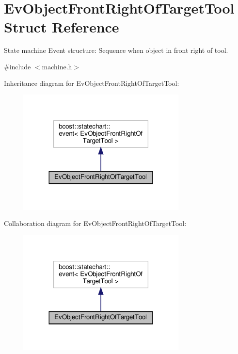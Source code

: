 \hypertarget{structEvObjectFrontRightOfTargetTool}{}\section{Ev\+Object\+Front\+Right\+Of\+Target\+Tool Struct Reference}
\label{structEvObjectFrontRightOfTargetTool}


State machine Event structure\+: Sequence when object in front right of tool.  




{\ttfamily \#include $<$machine.\+h$>$}



Inheritance diagram for Ev\+Object\+Front\+Right\+Of\+Target\+Tool\+:
\nopagebreak
\begin{figure}[H]
\begin{center}
\leavevmode
\includegraphics[width=240pt]{structEvObjectFrontRightOfTargetTool__inherit__graph}
\end{center}
\end{figure}


Collaboration diagram for Ev\+Object\+Front\+Right\+Of\+Target\+Tool\+:
\nopagebreak
\begin{figure}[H]
\begin{center}
\leavevmode
\includegraphics[width=240pt]{structEvObjectFrontRightOfTargetTool__coll__graph}
\end{center}
\end{figure}


